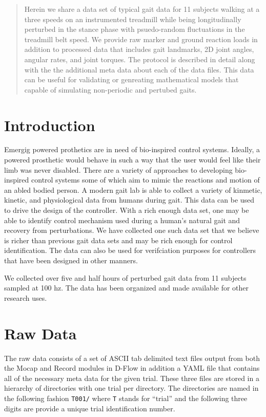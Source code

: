 \documentclass{article}
\begin{document}
\begin{abstract}

  Herein we share a data set of typical gait data for 11 subjects walking at a
  three speeds on an instrumented treadmill while being longitudinally
  perturbed in the stance phase with psuedo-random fluctuations in the
  treadmill belt speed. We provide raw marker and ground reaction loads in
  addition to processed data that includes gait landmarks, 2D joint angles,
  angular rates, and joint torques. The protocol is described in detail along
  with the the additional meta data about each of the data files. This data can
  be useful for validating or genreating mathematical models that capable of
  simulating non-periodic and pertubed gaits.

\end{abstract}

\section{Introduction}

Emergig powered prothetics are in need of bio-inspired control systems.
Ideally, a powered prosthetic would behave in such a way that the user would
feel like their limb was never disabled. There are a variety of approaches to
developing bio-inspired control systems some of which aim to mimic the
reactions and motion of an abled bodied person. A modern gait lab is able to
collect a variety of kinmetic, kinetic, and physiological data from humans
during gait. This data can be used to drive the design of the controller. With
a rich enough data set, one may be able to identify control mechanism used
during a human's natural gait and recovery from perturbations. We have
collected one such data set that we believe is richer than previous gait data
sets and may be rich enough for control identification. The data can also be
used for verifciation purposes for controllers that have been designed in other
manners.

We collected over five and half hours of perturbed gait data from 11 subjects
sampled at 100 hz. The data has been organized and made available for other
research uses.

\section{Raw Data}

The raw data consists of a set of ASCII tab delimited text files output from
both the Mocap and Record modules in D-Flow in addition a YAML file that
contains all of the necessary meta data for the given trial. These three files
are stored in a hierarchy of directories with one trial per directory. The
directories are named in the following fashion \verb+T001/+ where \verb+T+
stands for ``trial'' and the following three digits are provide a unique trial
identification number.
\end{document}
